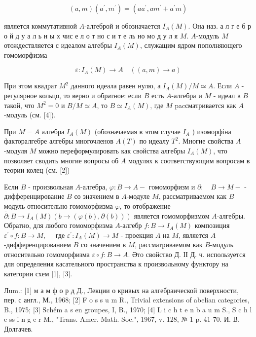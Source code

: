 \documentclass[10pt]{article}
\begin{document}
\[

(a, m)\left(a^{\prime}, m^{\prime}\right)=\left(a a^{\prime}, a m^{\prime}+a^{\prime} m\right)

\]



является коммутативной $A$-алгеброй и обозначается $I_{A}(M)$. Она наз. а л г е б р о й д у а л ь н ы х чис е л о т но с и т е ль но мо д у л я $M$. $A$-модуль $M$ отождествляется с идеалом алгебры $I_{A}(M)$, служащим ядром пополняющего гомоморфизма



\[

\varepsilon: I_{A}(M) \longrightarrow A \quad((a, m) \longrightarrow a)

\]



При этом квадрат $M^{2}$ данного идеала равен нулю, а $I_{A}(M) / M \simeq A$. Если $A$ - регулярное кольцо, то верно и обратное: если $B$ есть $A$-алгебра и $M$ - идеал в $B$ такой, что $M^{2}=0$ и $B / M \simeq A$, то $B \simeq I_{A}(M)$, где $M$ pacсматривается как $A$-модуль (см. [4]).



При $M=A$ алгебра $I_{A}(M)$ (обозначаемая в этом случае $I_{A}$ ) изоморфіна факторалгебре алгебры многочленов $A(T)$ по идеалу $T^{2}$. Многие свойства $A$-модуля $M$ можно переформулировать как свойства алгебры $I_{A}(M)$, что позволяет сводить многие вопросы об $A$ модулях к соответствующим вопросам в теории колец (см. [2])



Если $B$ - произвольная $A$-алгебра, $\varphi: B \rightarrow A-$ гомоморфизм и $\partial: \quad B \rightarrow M-$ - дифференцирование $B$ со значением в $A$-модуле $M$, рассматриваемом как $B$ модуль относительно гомоморфизма $\varphi$, то отображение $\bar{\partial}: B \rightarrow I_{A}(M)(b \rightarrow(\varphi(b), \partial(b)))$ является гомоморфизмом $A$-алгебры. Обратно, для любого гомоморфизма $A$-алгебр $f: B \rightarrow I_{A}(M)$ композиция $\varepsilon^{\prime} \circ f: B \rightarrow M, \quad$ где $\varepsilon^{\prime}: I_{A}(M) \rightarrow M$ - проекция $A$ на $M$, является $A$-дифференцированием $B$ со значением в $M$, рассматриваемом как $B$-модуль относительно гомоморфизма $\varepsilon \circ f: B \rightarrow A$. Әто свойство Д. ІІ Д. ч. используется для определения касательного пространства к произвольному функтору на категории схем [1], [3].



Лum.: [1] м а м ф о р д Д., Лекции о кривых на алгебраической поверхности, пер. с англ., М., 1968; [2] F o s s u m R., Trivial extensions of abelian categories, B., 1975; [3] $\mathrm{S} \mathrm{c} \mathrm{h} \mathrm{é} \mathrm{m}$ a s en groupes, I, B., 1970; [4] L i c h t e n b a u m S., S c h l e ss i n g e r M., "Trans. Amer. Math. Soc.", 1967, v. 128, № 1 p. 41-70. И. В. Долгачев.
\end{document}
